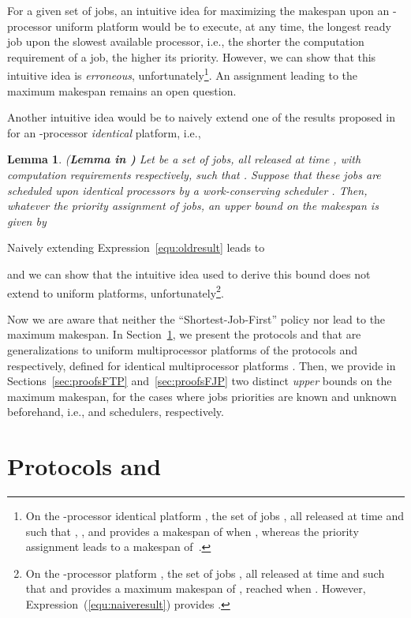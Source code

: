 \documentclass[10pt,english,a4paper]{article}
\newtheorem{lemma}{Lemma}
\newtheorem{validity test}{Validity Test}
\begin{document}
For a given set of jobs, an intuitive idea for maximizing the makespan upon an -processor uniform platform would be to execute, at any time, the longest ready job upon the slowest available processor, i.e., the shorter the computation requirement of a job, the higher its priority. However, we can show that this intuitive idea is {\em erroneous}, unfortunately\footnote{On the -processor identical platform , the set of jobs , all released at time  and such that , ,  and  provides a makespan of  when , whereas the priority assignment  leads to a makespan of~.}. An  assignment leading to the maximum makespan remains an open question.

Another intuitive idea would be to naively extend one of the results proposed in~\cite{Nelis1} for an -processor {\em identical} platform, i.e.,
\begin{lemma}\label{upms} {(\bf Lemma  in \cite{Nelis1})} 
Let  be a set of  jobs, all released at time , with computation requirements  respectively, such that . Suppose that these jobs are scheduled upon  {\em identical} processors by a work-conserving scheduler . Then, whatever the priority assignment of jobs, an upper bound on the makespan is given by

\end{lemma}
Naively extending Expression~\ref{equ:oldresult} leads to

and we can show that the intuitive idea used to derive this bound does not extend to uniform platforms, unfortunately\footnote{On the -processor platform , the set of jobs , all released at time  and such that  and  provides a maximum makespan of , reached when . However, Expression~(\ref{equ:naiveresult}) provides .}.

Now we are aware that neither the ``Shortest-Job-First'' policy nor  lead to the maximum makespan. In Section~\ref{sec:protocols}, we present the protocols  and  that are generalizations to uniform multiprocessor platforms of the protocols  and  respectively, defined for identical multiprocessor platforms \cite{Nelis1}. Then, we provide in Sections~\ref{sec:proofsFTP} and~\ref{sec:proofsFJP} two distinct {\em upper} bounds on the maximum makespan, for the cases where jobs priorities are known and unknown beforehand, i.e.,  and  schedulers, respectively.

\section{Protocols  and }
\label{sec:protocols}
\end{document}

